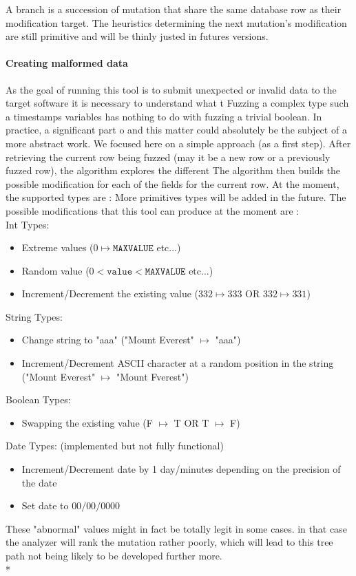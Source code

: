 \documentclass{article}
\begin{document}
\begin{empfile}
\bigskip				
				
A branch is a succession of mutation that share the same database row as their modification target.
The heuristics determining the next mutation's modification are still   primitive and will be thinly justed in futures versions.								 
				\paragraph{Creating malformed data} 
As the goal of running this tool is to submit unexpected or invalid data to the target software it is necessary to understand what t
Fuzzing a complex type such a timestamps variables has nothing to do with fuzzing a trivial boolean. In practice, a significant part o
and this matter could absolutely be the subject of a more abstract work. We focused here on a   simple approach (as a first step).
After retrieving the current row being fuzzed (may it be a new row or a previously fuzzed row), the algorithm explores the different
The algorithm then builds the possible modification for each of the fields for the current row.
At the moment, the supported types are : %
More primitives types will be added in the future.
The possible modifications that this tool can produce at the moment are : \\ %
				Int Types:
				\begin{itemize}
		
					\item Extreme values ($0 \mapsto \texttt{MAXVALUE}$ etc...)
					\item Random value ($0<\texttt{value}<\texttt{MAXVALUE}$ etc...)
					\item Increment/Decrement the existing value ($332 \mapsto 333$ OR $332 \mapsto 331$)
				\end{itemize}
				String Types:
				\begin{itemize}
					\item Change string to "aaa" ("Mount Everest" $\mapsto$ "aaa")
					\item Increment/Decrement ASCII character at a random position in the string ("Mount Everest" $\mapsto$ "Mount Fverest")
				\end{itemize}
					Boolean Types:
				\begin{itemize}						
					\item Swapping the existing value (F $\mapsto$ T OR T $\mapsto$ F)
				\end{itemize}
					Date Types: (implemented but not fully functional)			
				\begin{itemize}
					\item Increment/Decrement date by 1 day/minutes depending on the precision of the date
					\item Set date to $00/00/0000$ 
				\end{itemize}
These "abnormal" values might in fact be totally legit in some cases. in that case the analyzer 
will rank the mutation rather poorly, which will lead to this tree path not being   likely to be developed further more.
				\\*

\end{empfile}
\end{document}
